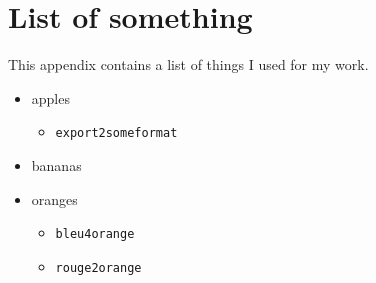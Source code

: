 \chapter{List of something} 
This appendix contains a list of things I used for my work.

\begin{itemize}
 \item apples
 \begin{itemize}
  \item \texttt{export2someformat}
 \end{itemize}
 \item bananas
 \item oranges
 \begin{itemize}
  \item \texttt{bleu4orange}
  \item \texttt{rouge2orange}
 \end{itemize}

\end{itemize}


\newpage
